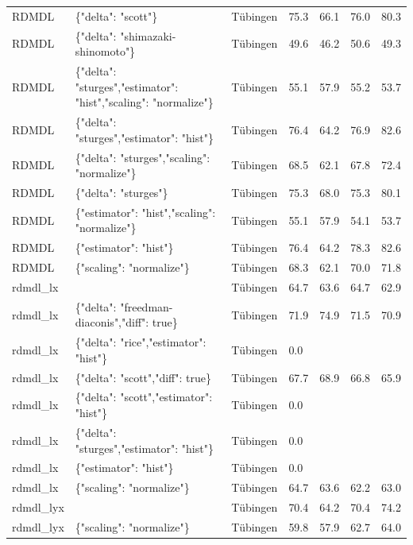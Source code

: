 \begin{tabular}{lllllll}
RDMDL & \{"delta": "scott"\} & Tübingen & 75.3 & 66.1 & 76.0 & 80.3 \\
RDMDL & \{"delta": "shimazaki-shinomoto"\} & Tübingen & 49.6 & 46.2 & 50.6 & 49.3 \\
RDMDL & \{"delta": "sturges","estimator": "hist","scaling": "normalize"\} & Tübingen & 55.1 & 57.9 & 55.2 & 53.7 \\
RDMDL & \{"delta": "sturges","estimator": "hist"\} & Tübingen & 76.4 & 64.2 & 76.9 & 82.6 \\
RDMDL & \{"delta": "sturges","scaling": "normalize"\} & Tübingen & 68.5 & 62.1 & 67.8 & 72.4 \\
RDMDL & \{"delta": "sturges"\} & Tübingen & 75.3 & 68.0 & 75.3 & 80.1 \\
RDMDL & \{"estimator": "hist","scaling": "normalize"\} & Tübingen & 55.1 & 57.9 & 54.1 & 53.7 \\
RDMDL & \{"estimator": "hist"\} & Tübingen & 76.4 & 64.2 & 78.3 & 82.6 \\ 
RDMDL & \{"scaling": "normalize"\} & Tübingen & 68.3 & 62.1 & 70.0 & 71.8 \\
rdmdl\_lx &  & Tübingen & 64.7 & 63.6 & 64.7 & 62.9 \\
rdmdl\_lx & \{"delta": "freedman-diaconis","diff": true\} & Tübingen & 71.9 & 74.9 & 71.5 & 70.9 \\
rdmdl\_lx & \{"delta": "rice","estimator": "hist"\} & Tübingen & 0.0 &  &  &  \\
rdmdl\_lx & \{"delta": "scott","diff": true\} & Tübingen & 67.7 & 68.9 & 66.8 & 65.9 \\
rdmdl\_lx & \{"delta": "scott","estimator": "hist"\} & Tübingen & 0.0 &  &  &  \\
rdmdl\_lx & \{"delta": "sturges","estimator": "hist"\} & Tübingen & 0.0 &  &  &  \\
rdmdl\_lx & \{"estimator": "hist"\} & Tübingen & 0.0 &  &  &  \\
rdmdl\_lx & \{"scaling": "normalize"\} & Tübingen & 64.7 & 63.6 & 62.2 & 63.0 \\
rdmdl\_lyx &  & Tübingen & 70.4 & 64.2 & 70.4 & 74.2 \\
rdmdl\_lyx & \{"scaling": "normalize"\} & Tübingen & 59.8 & 57.9 & 62.7 & 64.0 \\
\bottomrule
\end{tabular}
